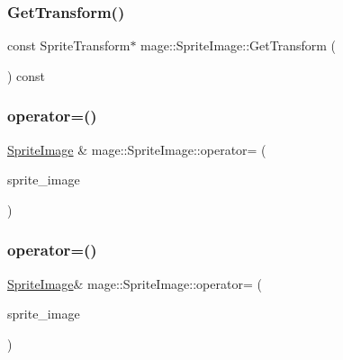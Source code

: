 \subsubsection{\texorpdfstring{Get\+Transform()}{GetTransform()}\hspace{0.1cm}{\footnotesize\ttfamily [2/2]}}
{\footnotesize\ttfamily const Sprite\+Transform$\ast$ mage\+::\+Sprite\+Image\+::\+Get\+Transform (\begin{DoxyParamCaption}{ }\end{DoxyParamCaption}) const}

\hypertarget{classmage_1_1_sprite_image_a67d97b92e93059eadaf4bd22447e0be9}{}\label{classmage_1_1_sprite_image_a67d97b92e93059eadaf4bd22447e0be9} 
\subsubsection{\texorpdfstring{operator=()}{operator=()}\hspace{0.1cm}{\footnotesize\ttfamily [1/2]}}
{\footnotesize\ttfamily \hyperlink{classmage_1_1_sprite_image}{Sprite\+Image} \& mage\+::\+Sprite\+Image\+::operator= (\begin{DoxyParamCaption}\item[{const \hyperlink{classmage_1_1_sprite_image}{Sprite\+Image} \&}]{sprite\+\_\+image }\end{DoxyParamCaption})}

\hypertarget{classmage_1_1_sprite_image_ac30edc4a29f41ad83f341a140335ddde}{}\label{classmage_1_1_sprite_image_ac30edc4a29f41ad83f341a140335ddde} 
\subsubsection{\texorpdfstring{operator=()}{operator=()}\hspace{0.1cm}{\footnotesize\ttfamily [2/2]}}
{\footnotesize\ttfamily \hyperlink{classmage_1_1_sprite_image}{Sprite\+Image}\& mage\+::\+Sprite\+Image\+::operator= (\begin{DoxyParamCaption}\item[{\hyperlink{classmage_1_1_sprite_image}{Sprite\+Image} \&\&}]{sprite\+\_\+image }\end{DoxyParamCaption})\hspace{0.3cm}{\ttfamily [default]}}

